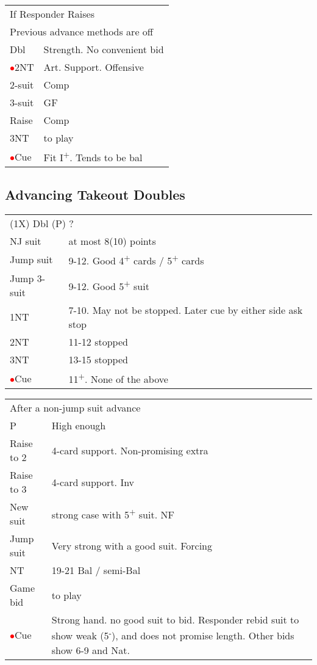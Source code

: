 \documentclass{article}
\newcommand{\nt}{\relsize{-1}NT\relsize{1}}
\newcommand{\up}{\textsuperscript{+}}
\newcommand{\down}{\textsuperscript{-}}
\newcommand{\al}{\textcolor{red}{$\bullet$}}
\begin{document}
\medskip

\begin{tabular}{|l|p{6.5cm}}
	\multicolumn{2}{l}{If Responder Raises} \\
	\multicolumn{2}{l}{Previous advance methods are off} \\
	Dbl & Strength. No convenient bid \\
	\al{}2\nt{} & Art. Support. Offensive \\
	2-suit & Comp \\
	3-suit & GF \\
	Raise & Comp \\
	3\nt{} & to play \\
	\al{}Cue & Fit I\up{}. Tends to be bal \\
\end{tabular}

\subsection{Advancing Takeout Doubles}
\begin{tabular}{|l|p{6.5cm}}
	\multicolumn{2}{l}{(1X) Dbl (P) ?} \\
  NJ suit & at most 8(10) points \\
	Jump suit & 9-12. Good 4\up{} cards / 5\up{} cards \\
	Jump 3-suit & 9-12. Good 5\up{} suit \\
	1\nt{} & 7-10. May not be stopped. Later cue by either side ask stop \\
	2\nt{} & 11-12 stopped \\
	3\nt{} & 13-15 stopped \\
	\al{}Cue & 11\up{}. None of the above \\
\end{tabular}

\medskip

\begin{tabular}{|l|p{6.5cm}}
	\multicolumn{2}{l}{After a non-jump suit advance} \\
  P & High enough \\
	Raise to 2 & 4-card support. Non-promising extra \\
	Raise to 3 & 4-card support. Inv \\
	New suit & strong case with 5\up{} suit. NF \\
	Jump suit & Very strong with a good suit. Forcing \\
	\nt{} & 19-21 Bal / semi-Bal \\
	Game bid & to play \\
	\al{}Cue & Strong hand. no good suit to bid. Responder rebid suit to show weak (5\down{}), and does not promise length. Other bids show 6-9 and Nat. \\
\end{tabular}
\end{document}
